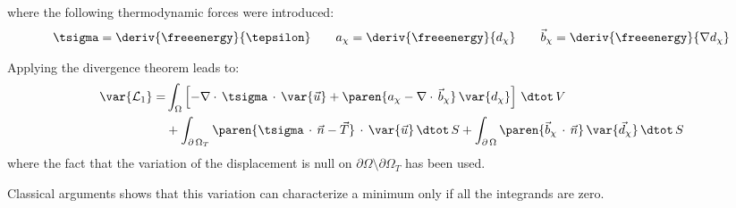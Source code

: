 where the following thermodynamic forces were introduced:
\begin{equation}
  \label{eq:ef_micromorphic:formulation:thermodynamic_forces}
  \begin{aligned}
    \tsigma  = \deriv{\freeenergy}{\tepsilon} \quad\quad
    a_{\chi} = \deriv{\freeenergy}{d_{\chi}} \quad\quad
    \vec{b}_{\chi} = \deriv{\freeenergy}{\nabla d_{\chi}}
  \end{aligned}
\end{equation}

Applying the divergence theorem leads to:
\begin{equation}
  \label{eq:ef_micromorphic:formulation:lagrangian_variation_2}
  \begin{aligned}
    \var{\mathcal{L}_{1}}
    =
    &
    \int_{\Omega}
    \left[
      -\nabla \cdot\,\tsigma\,\cdot\,\var{\vec{u}}+
      \paren{a_{\chi}-\nabla \cdot\,\vec{b}_{\chi}}\,\var{d_{\chi}}
    \right]
    \,\dtot\,V
    \\
    & +
    \int_{\partial\,\Omega_{T}} \paren{\tsigma\,\cdot\,\vec{n}
    -
    \vec{T}}\,\cdot\,\var{\vec{u}} \,\dtot\,S
    +
    \int_{\partial\,\Omega} \paren{\vec{b}_{\chi}\,\cdot\,\vec{n}}\,\var{\vec{d}_{\chi}} \,\dtot\,S
  \end{aligned}
\end{equation}
where the fact that the variation of the
displacement is null on $\partial\Omega\setminus\partial\Omega_{T}$
has been used.

Classical arguments shows that this variation can characterize a
minimum only if all the integrands are zero.


